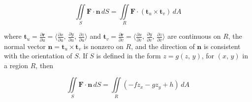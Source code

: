 \begin{equation}
    \iint \limits _S \mathbf{F \cdot n} \, dS = \iint \limits _R \mathbf{F} \cdot (\mathbf{t}_u \times \mathbf{t}_v) \, dA
\end{equation}

where $\mathbf{t}_u  = \frac{\partial \mathbf{r}}{\partial u} = \langle \frac{\partial x}{\partial u},\, \frac{\partial y}{\partial u},\, \frac{\partial z}{\partial u} \rangle$ and $\mathbf{t}_v  = \frac{\partial \mathbf{r}}{\partial v} = \langle \frac{\partial x}{\partial v},\, \frac{\partial y}{\partial v},\, \frac{\partial z}{\partial v} \rangle$ are continuous on $R$, the normal vector $\mathbf{n} = \mathbf{t}_u \times \mathbf{t}_v$ is nonzero on $R$, and the direction of $\mathbf{n}$ is consistent with the orientation of $S$. If $S$ is defined in the form $z = g(z,\, y)$, for $(x,\, y)$ in a region $R$, then

\begin{equation}
    \iint \limits _S \mathbf{F \cdot n} \, dS = \iint \limits _R (-fz_x - gz_y + h)\, dA
\end{equation}
